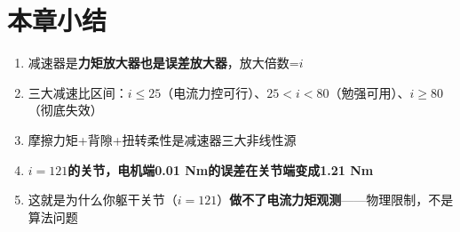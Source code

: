 \section*{本章小结}

\begin{summarybox}{}
\begin{enumerate}
  \item 减速器是\textbf{力矩放大器也是误差放大器}，放大倍数=$i$
  \item 三大减速比区间：$i \leq 25$（电流力控可行）、$25 < i < 80$（勉强可用）、$i \geq 80$（彻底失效）
  \item 摩擦力矩+背隙+扭转柔性是减速器三大非线性源
  \item \textbf{$i=121$的关节，电机端0.01 Nm的误差在关节端变成1.21 Nm}
  \item 这就是为什么你躯干关节（$i=121$）\textbf{做不了电流力矩观测}——物理限制，不是算法问题
\end{enumerate}
\end{summarybox}

\newpage
